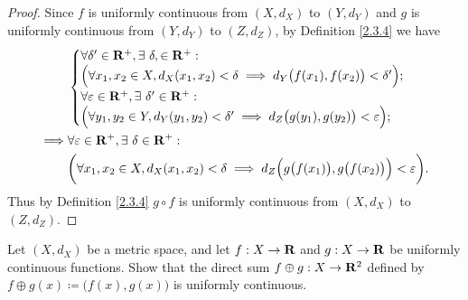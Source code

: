 \begin{proof}
    Since \(f\) is uniformly continuous from \((X, d_X)\) to \((Y, d_Y)\) and \(g\) is uniformly continuous from \((Y, d_Y)\) to \((Z, d_Z)\), by Definition \ref{2.3.4} we have
    \begin{align*}
                 & \begin{cases}
                       \forall \delta' \in \mathbf{R}^+, \exists\ \delta, \in \mathbf{R}^+ :                                                    \\
                       \Big(\forall x_1, x_2 \in X, d_X(x_1, x_2) < \delta \implies d_Y\big(f(x_1), f(x_2)\big) < \delta'\Big); \\
                       \forall \varepsilon \in \mathbf{R}^+, \exists\ \delta' \in \mathbf{R}^+ :                                                \\
                       \Big(\forall y_1, y_2 \in Y, d_Y(y_1, y_2) < \delta' \implies d_Z\big(g(y_1), g(y_2)\big) < \varepsilon\Big);
                   \end{cases}                         \\
        \implies & \forall \varepsilon \in \mathbf{R}^+, \exists\ \delta \in \mathbf{R}^+ :                                                                             \\
                 & \bigg(\forall x_1, x_2 \in X, d_X(x_1, x_2) < \delta \implies d_Z\Big(g\big(f(x_1)\big), g\big(f(x_2)\big)\Big) < \varepsilon\bigg).
    \end{align*}
    Thus by Definition \ref{2.3.4} \(g \circ f\) is uniformly continuous from \((X, d_X)\) to \((Z, d_Z)\).
\end{proof}

\begin{exercise}\label{ex 2.3.5}
    Let \((X, d_X)\) be a metric space, and let \(f : X \to \mathbf{R}\) and \(g : X \to \mathbf{R}\) be uniformly continuous functions.
    Show that the direct sum \(f \oplus g : X \to \mathbf{R}^2\) defined by \(f \oplus g(x) \coloneqq \big(f(x), g(x)\big)\) is uniformly continuous.
\end{exercise}

